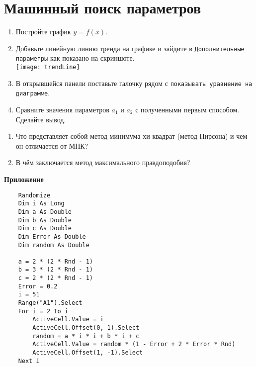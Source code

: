 \documentclass[14pt,a4paper]{article}
\begin{document}
\section{Машинный поиск параметров}
\begin{enumerate}
	\item Постройте график $y = f(x)$.
	\item Добавьте линейную линию тренда на графике и зайдите в \texttt{Дополнительные параметры} как показано на скриншоте.\\
	\texttt{[image: trendLine]}
	\item В открывшейся панели поставьте галочку рядом с \texttt{показывать уравнение на диаграмме}.
	\item Сравните значения параметров $a_1$ и $a_2$ с полученными первым способом. Сделайте вывод.
\end{enumerate}

\questions{}
\begin{enumerate}
	\item Что представляет собой метод минимума хи-квадрат (метод Пирсона) и чем он отличается от МНК?
	\item В чём заключается метод максимального правдоподобия?
\end{enumerate}

\printbibliography[title={Литература}]	
\begin{center}
	\textbf{\Large Приложение}
\end{center}
	\renewcommand{\lstlistingname}{Листинг}
\begin{lstlisting}
	Randomize
	Dim i As Long
	Dim a As Double
	Dim b As Double
	Dim c As Double
	Dim Error As Double
	Dim random As Double

	a = 2 * (2 * Rnd - 1)
	b = 3 * (2 * Rnd - 1)
	c = 2 * (2 * Rnd - 1)
	Error = 0.2
	i = 51
	Range("A1").Select
	For i = 2 To i
		ActiveCell.Value = i
		ActiveCell.Offset(0, 1).Select
		random = a * i * i + b * i + c
		ActiveCell.Value = random * (1 - Error + 2 * Error * Rnd)
		ActiveCell.Offset(1, -1).Select
	Next i
	\end{lstlisting}
\end{document}
